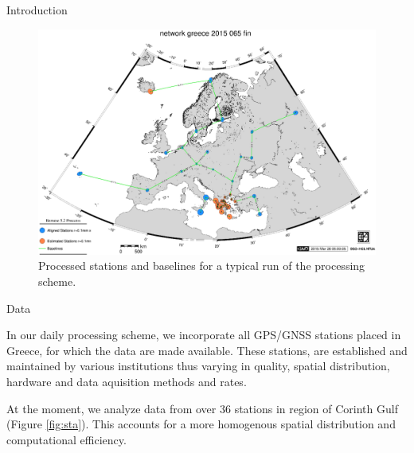 \documentclass[final,a0,portrait]{beamer}
\newlength{\onecolwid}
\begin{document}
\begin{frame}[t]
\begin{columns}[t]
\begin{column}{\onecolwid}
\begin{block}{Introduction}
{}

\begin{figure}
    \centering
    \includegraphics[width=0.7\onecolwid]{eu-greece-15065-fin-proc.eps}
    \caption{Processed stations and baselines for a typical run of the processing scheme.}
    \label{fig:proc-net}
\end{figure}

\end{block}
\begin{block}{Data}
{\small
In our daily processing scheme, we incorporate all GPS/GNSS stations placed in Greece, for which the data are made available. 
These stations, are established and maintained by various institutions thus varying in quality, spatial distribution, hardware and 
data aquisition methods and rates.

At the moment, we analyze data from over 36 stations in region of Corinth Gulf (Figure \ref{fig:sta}). 
This accounts for a more homogenous spatial distribution and computational efficiency.


}
\end{block}
\end{column}
\end{columns}
\end{frame}
\end{document}
